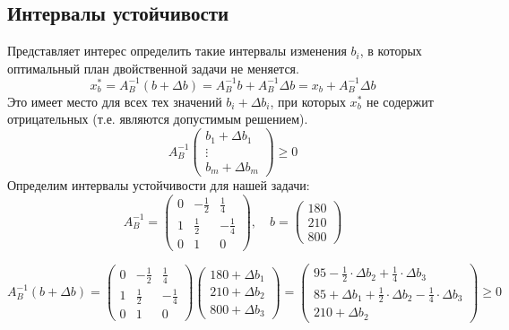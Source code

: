 \documentclass[17pt]{extarticle}
\begin{document}
\subsection{Интервалы устойчивости}
Представляет интерес определить такие интервалы изменения \( b_i \), в которых оптимальный план двойственной задачи не меняется.
\[
    x_b^* = A_B^{-1}(b + \Delta b) = A_B^{-1}b + A_B^{-1}\Delta b = x_b + A_B^{-1}\Delta b
\]
Это имеет место для всех тех значений \( b_i + \Delta b_i \), при которых \( x_b^* \) не содержит отрицательных (т.е. являются допустимым решением).
\[
    A_B^{-1}
    \begin{pmatrix}
        b_1 + \Delta b_1 \\
        \vdots           \\
        b_m + \Delta b_m
    \end{pmatrix}
    \geq 0
\]
Определим интервалы устойчивости для нашей задачи:
\[
    A_B^{-1} =
    \begin{pmatrix}
        0 & -\frac{1}{2} & \frac{1}{4}  \\
        1 & \frac{1}{2}  & -\frac{1}{4} \\
        0 & 1            & 0
    \end{pmatrix}, \quad b =
    \begin{pmatrix}
        180 \\
        210 \\
        800
    \end{pmatrix}
\]

\[
    A_B^{-1}(b + \Delta b) =
    \begin{pmatrix}
        0 & -\frac{1}{2} & \frac{1}{4}  \\
        1 & \frac{1}{2}  & -\frac{1}{4} \\
        0 & 1            & 0
    \end{pmatrix}
    \begin{pmatrix}
        180 + \Delta b_1 \\
        210 + \Delta b_2 \\
        800 + \Delta b_3
    \end{pmatrix}
    =
    \begin{pmatrix}
        95 - \frac{1}{2} \cdot \Delta b_2 + \frac{1}{4} \cdot \Delta b_3              \\
        85 + \Delta b_1 + \frac{1}{2} \cdot \Delta b_2 - \frac{1}{4} \cdot \Delta b_3 \\
        210 + \Delta b_2
    \end{pmatrix}
    \geq 0
\]
\end{document}
